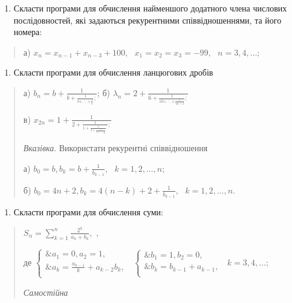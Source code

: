 \documentclass[]{article}
\begin{document}
\begin{enumerate}
\def\labelenumi{\arabic{enumi})}
\item
  Скласти програми для обчислення найменшого додатного члена числових
  послідовностей, які задаються рекурентними співвідношеннями, та його
  номера:
\end{enumerate}

\begin{quote}
а)
\(x_{n} = x_{n - 1} + x_{n - 3} + 100,\mathrm{\text{\ \ \ \ \ }}x_{1} = x_{2} = x_{3} = - 99,\mathrm{\text{\ \ \ }}n = 3,4,\ldots;\)
\end{quote}

\begin{enumerate}
\def\labelenumi{\arabic{enumi})}
\item
  Скласти програми для обчислення ланцюгових дробів
\end{enumerate}

\begin{quote}
а) \(b_{n} = b + \frac{1}{b + \frac{1}{b + \ddots + \frac{1}{b}};}\); б)
\(\lambda_{n} = 2 + \frac{1}{6 + \frac{1}{10 + \ddots + \frac{1}{4n + 2}};}\)

в)
\(x_{2n} = 1 + \frac{1}{2 + \frac{1}{1 + \frac{1}{2 + \frac{1}{1 + \ddots + \frac{1}{2}}}.};}\)

\emph{\emph{Вказівка}}. Використати рекурентні співвідношення

а)
\(b_{0} = b,b_{k} = b + \frac{1}{b_{k - 1}},\mathrm{\text{\ \ }}k = 1,2,\ldots,n;\)

б)
\(b_{0} = 4n + 2,b_{k} = 4(n - k) + 2 + \frac{1}{b_{k - 1}},\mathrm{\text{\ \ }}k = 1,2,\ldots,n.\)
\end{quote}

\begin{enumerate}
\def\labelenumi{\arabic{enumi})}
\item
  Скласти програми для обчислення суми:
\end{enumerate}

\begin{quote}
\(S_{n} = \sum_{k = 1}^{n}\frac{2^{k}}{a_{k} + b_{k}},\) ,

де \(\left\{ \begin{matrix}
\& a_{1} = 0,a_{2} = 1, \\
\& a_{k} = \frac{a_{k - 1}}{k} + a_{k - 2}b_{k}, \\
\end{matrix} \right.\ \) \(\left\{ \begin{matrix}
\& b_{1} = 1,b_{2} = 0, \\
\& b_{k} = b_{k - 1} + a_{k - 1}, \\
\end{matrix} \right.\ \) \(k = 3,4,\ldots;\)

\emph{Самостійна}
\end{quote}
\end{document}

